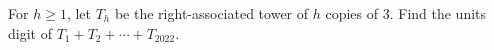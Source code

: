 For $h\ge1$, let $T_h$ be the right-associated tower of $h$ copies of 3. Find the units digit of $T_1+T_2+\cdots+T_{2022}$.
